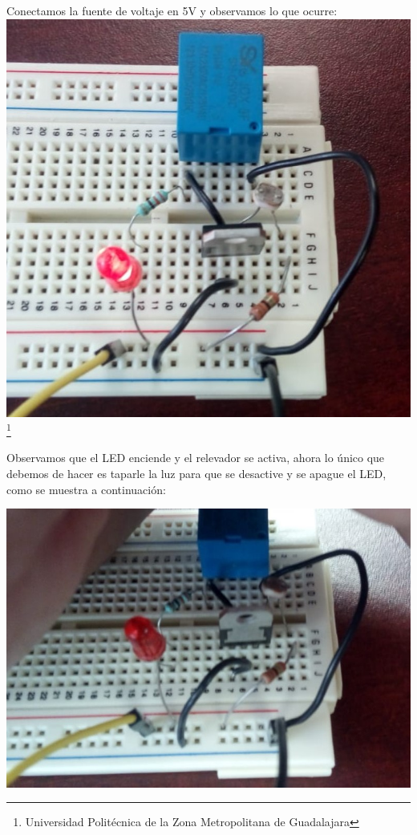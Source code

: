 \documentclass[10pt,a4paper]{article}
\begin{document}
Conectamos la fuente de voltaje en 5V y observamos lo que ocurre: \\


\centering
\includegraphics[scale=0.4]{10.jpeg}\\

\footnote{Universidad Politécnica de la Zona Metropolitana de Guadalajara}

\newpage
 Observamos que el LED enciende y el relevador se activa, ahora lo único que debemos de hacer es taparle la luz para que se desactive y se apague el LED, como se muestra a continuación: 

 \centering
 \includegraphics[scale=0.4]{11.jpeg}
\end{document}

